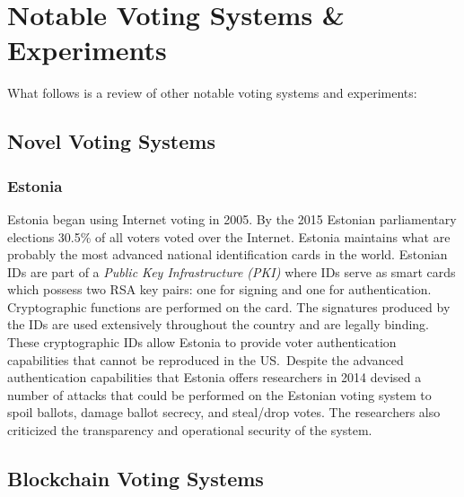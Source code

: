 \section{Notable Voting Systems \& Experiments}
What follows is a review of other notable voting systems and experiments:

\subsection{Novel Voting Systems}

\subsubsection{Estonia}
Estonia began using Internet voting in 2005. By the 2015 Estonian parliamentary
elections 30.5\% of all voters voted over the Internet. Estonia maintains what
are probably the most advanced national identification cards in the world.
Estonian IDs are part of a \emph{Public Key Infrastructure (PKI)} where IDs
serve as smart cards which possess two RSA key pairs: one for signing and one
for authentication. Cryptographic functions are performed on the card. The
signatures produced by the IDs are used extensively throughout the country and
are legally binding. These cryptographic IDs allow Estonia to provide voter
authentication capabilities that cannot be reproduced in the US.\ Despite the
advanced authentication capabilities that Estonia offers researchers in 2014
devised a number of attacks that could be performed on the Estonian voting
system to spoil ballots, damage ballot secrecy, and steal/drop votes. The
researchers also criticized the transparency and operational security of the
system.

\subsection{Blockchain Voting Systems}

%
%

